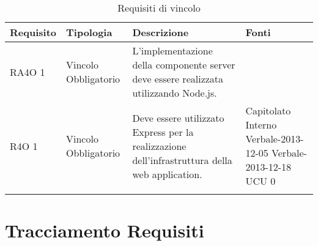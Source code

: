 			\begin{center}
			\bgroup
			\def\arraystretch{1.8}
			\begin{longtable}{ | l | p{2cm} | p{5cm} | p{1.7cm} |}
		
			\cellcolor[gray]{0.9} \textbf{Requisito} & \cellcolor[gray]{0.9} \textbf{Tipologia} 
			& \cellcolor[gray]{0.9} \textbf{Descrizione} & \cellcolor[gray]{0.9} \textbf{Fonti} \\ \hline
      
				RA4O 1 & Vincolo \newline  Obbligatorio  & L’implementazione della componente server deve essere realizzata utilizzando Node.js. &  \\ \hline      
				R4O 1 & Vincolo \newline  Obbligatorio  & Deve essere utilizzato Express per la realizzazione dell’infrastruttura della web application. &  Capitolato \newline  Interno \newline  Verbale-2013-12-05 \newline  Verbale-2013-12-18 \newline  UCU 0 \newline  \\ \hline
			\caption{Requisiti di vincolo}
			\end{longtable}
			\egroup
			\end{center}  
\clearpage
\section{Tracciamento Requisiti}
